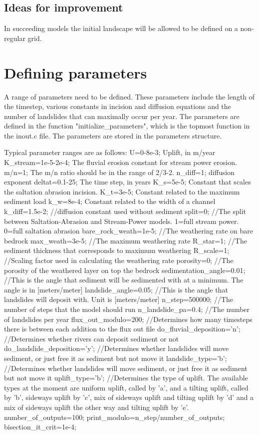 \documentclass[a4paper,12pt,oneside,article,]{memoir}
\begin{document}
\subsection{Ideas for improvement}
In succeeding models the initial landscape will be allowed to be defined on a non-regular grid. 

\section{Defining parameters}
A range of parameters need to be defined. These parameters include the length of the timestep, various constants in incision and diffusion equations and the number of landslides that can maximally occur per year.
The parameters are defined in the function "initialize_parameters", which is the topmost function in the inout.c file. The parameters are stored in the parameters structure.

Typical parameter ranges are as follows:
U=0-8e-3; Uplift, in m/year
K_stream=1e-5-2e-4; The fluvial erosion constant for stream power erosion.
m/n=1; The m/n ratio should be in the range of 2/3-2.
n_diff=1; diffusion exponent
deltat=0.1-25; The time step, in years
K_s=5e-5; Constant that scales the saltation abrasion incision.
K_t=3e-5; Constant related to the maximum sediment load
k_w=8e-4; Constant related to the width of a channel
k_diff=1.5e-2; //diffusion constant used without sediment
split=0; //The split between Saltation-Abrasion and Stream-Power models. 1=full stream power. 0=full saltation abrasion
bare_rock_weath=1e-5; //The weathering rate on bare bedrock
max_weath=3e-5; //The maximum weathering rate
R_star=1; //The sediment thickness that corresponds to maximum weathering
R_scale=1; //Scaling factor used in calculating the weathering rate
porosity=0; //The porosity of the weathered layer on top the bedrock
sedimentation_angle=0.01; //This is the angle that sediment will be sedimented with at a minimum. The angle is in [meters/meter]
landslide_angle=0.05; //This is the angle that landslides will deposit with. Unit is [meters/meter]
n_step=500000; //The number of steps that the model should run
n_landslide_pa=0.4; //The number of landslides per year
flux_out_modulo=200; //Determines how many timesteps there is between each addition to the flux out file
do_fluvial_deposition='n'; //Determines whether rivers can deposit sediment or not
do_landslide_deposition='y';  //Determines whether landslides will move sediment, or just free it as sediment but not move it
landslide_type='b';  //Determines whether landslides will move sediment, or just free it as sediment but not move it
uplift_type='b'; //Determines the type of uplift. The available types at the moment are uniform uplift, called by 'a', and a tilting uplift, called by 'b', sideways uplift by 'c', mix of sideways uplift and tilting uplift by 'd' and a mix of sideways uplift the other way and tilting uplift by 'e'.
number_of_outputs=100;
print_modulo=n_step/number_of_outputs;
bisection_it_crit=1e-4;


\backmatter


\end{document}
